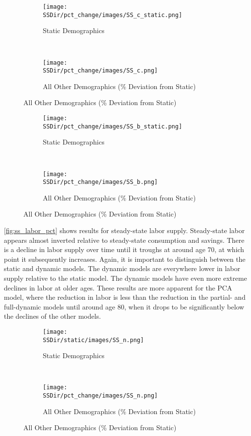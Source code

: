 \documentclass[10pt]{article}
\numberwithin{equation}{subsection}
\newcommand*{\SSDir}{../../code/Rick/OUTPUT/SS}
\begin{document}
\begin{figure}[H]
   \caption{\label{fig:ss_consumption_pct}Steady-State Consumption}
   \begin{subfigure}{0.5\textwidth}
      \centering
      \texttt{[image: \\SSDir/pct\_change/images/SS\_c\_static.png]}
      \caption{Static Demographics}
   \end{subfigure}%
   ~
   \begin{subfigure}{0.5\textwidth}
      \centering
      \texttt{[image: \\SSDir/pct\_change/images/SS\_c.png]}
      \caption{All Other Demographics (\% Deviation from Static)}
   \end{subfigure}
\end{figure}

\begin{figure}[H]
   \caption{\label{fig:ss_savings_pct}Steady-State Savings}
   \begin{subfigure}{0.5\textwidth}
      \centering
      \texttt{[image: \\SSDir/pct\_change/images/SS\_b\_static.png]}
      \caption{Static Demographics}
   \end{subfigure}%
   ~
   \begin{subfigure}{0.5\textwidth}
      \centering
      \texttt{[image: \\SSDir/pct\_change/images/SS\_b.png]}
      \caption{All Other Demographics (\% Deviation from Static)}
   \end{subfigure}
\end{figure}

\par \autoref{fig:ss_labor_pct} shows results for steady-state labor supply. Steady-state labor appears almost inverted relative to steady-state consumption and savings. There is a decline in labor supply over time until it troughs at around age 70, at which point it subsequently increases. Again, it is important to distinguish between the static and dynamic models. The dynamic models are everywhere lower in labor supply relative to the static model. The dynamic models have even more extreme declines in labor at older ages. These results are more apparent for the PCA model, where the reduction in labor is less than the reduction in the partial- and full-dynamic models until around age 80, when it drops to be significantly below the declines of the other models.

\begin{figure}[H]
   \caption{\label{fig:ss_labor_pct}Steady-State Labor}
   \begin{subfigure}{0.5\textwidth}
      \centering
      \texttt{[image: \\SSDir/static/images/SS\_n.png]}
      \caption{Static Demographics}
   \end{subfigure}%
   ~
   \begin{subfigure}{0.5\textwidth}
      \centering
      \texttt{[image: \\SSDir/pct\_change/images/SS\_n.png]}
      \caption{All Other Demographics (\% Deviation from Static)}
   \end{subfigure}
\end{figure}
\end{document}

